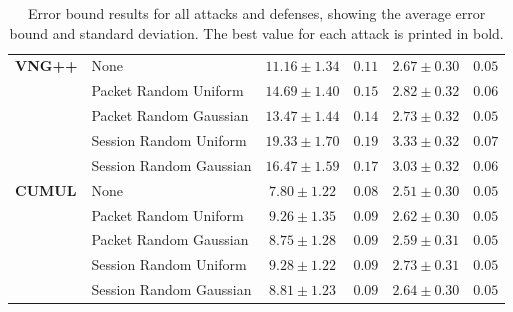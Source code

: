 \documentclass[
	ruledheaders=chapter,
	class=report,
	thesis={type=master, department=inf},
	accentcolor=1c,
	custommargins=true,
	marginpar=false,
	parskip=half-,
	fontsize=11pt,
]{tudapub}
\begin{document}
\begin{table}
\begin{tabular}{llcccc}
			\textbf{VNG++} & None & $11.16 \pm 1.34$ & $0.11$ & $2.67 \pm 0.30$ & $0.05$ \\
			 & Packet Random Uniform & $14.69 \pm 1.40$ & $0.15$ & $2.82 \pm 0.32$ & $0.06$ \\
			 & Packet Random Gaussian & $13.47 \pm 1.44$ & $0.14$ & $2.73 \pm 0.32$ & $0.05$ \\
			 & Session Random Uniform & $\mathbf{19.33 \pm 1.70}$ & $\mathbf{0.19}$ & $\mathbf{3.33 \pm 0.32}$ & $\mathbf{0.07}$ \\
			 & Session Random Gaussian & $16.47 \pm 1.59$ & $0.17$ & $3.03 \pm 0.32$ & $0.06$ \\ \addlinespace
			 
			\textbf{CUMUL} & None & $7.80 \pm 1.22$  & $0.08$ & $2.51 \pm 0.30$ & $0.05$ \\
			 & Packet Random Uniform & $9.26 \pm 1.35$ & $\mathbf{0.09}$ & $2.62 \pm 0.30$ & $0.05$ \\
			 & Packet Random Gaussian & $8.75 \pm 1.28$ & $\mathbf{0.09}$ & $2.59 \pm 0.31$ & $0.05$ \\
			 & Session Random Uniform & $\mathbf{9.28 \pm 1.22}$ & $\mathbf{0.09}$ & $\mathbf{2.73 \pm 0.31}$ & $0.05$ \\
			 & Session Random Gaussian & $8.81 \pm 1.23$ & $\mathbf{0.09}$ & $2.64 \pm 0.30$ & $0.05$ \\
			\bottomrule
		\end{tabular}
		\caption[Error bound results for all attacks and defenses]{Error bound results for all attacks and defenses, showing the average error bound and standard deviation. The best value for each attack is printed in bold.}
		\label{tbl:error_bound}
	\end{table}
\end{document}
